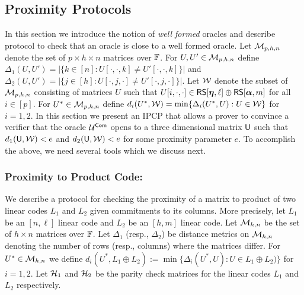 \subsection{Proximity Protocols}\label{sec:proximitybic}
In this section we introduce the notion of {\em well formed} oracles and
describe protocol to check that an oracle is close to a well formed oracle. Let
$\mathcal{M}_{p,h,n}$ denote the set of $p\times h\times n$ matrices over $\mathbb{F}$. For
$U,U'\in \mathcal{M}_{p,h,n}$ define $\Delta_1(U,U')=|\{k\in [n]: U[\cdot,\cdot,k]\neq
U'[\cdot,\cdot,k]\}|$ and $\Delta_2(U,U')=|\{j\in [h]: U[\cdot,j,\cdot]\neq
U'[\cdot,j,\cdot]\}|$. Let $\mathcal{W}$ denote the subset of $\mathcal{M}_{p,h,n}$
consisting of matrices $U$ such that $U[i,\cdot,\cdot]\in \mathsf{RS}[\bm{\eta},\ell]\oplus
\mathsf{RS}[\bm{\alpha},m]$ for all $i\in [p]$. For $U^\ast\in \mathcal{M}_{p,h,n}$ define
$d_i(U^\ast,\mathcal{W})=\min\{\Delta_i(U^\ast,U):U\in \mathcal{W}\}$ for $i=1,2$. In this
section we present an IPCP that allows a prover to convince a verifier that
the oracle $\mathcal{U}^{\mathsf{Com}}$ opens to a three dimensional matrix $\mathsf{U}$ such that
$d_1(\mathsf{U},\mathcal{W})<e$ and $d_2(\mathsf{U},\mathcal{W})<e$ for some proximity parameter
$e$. To accomplish the above, we need several tools which we discuss next.

\subsubsection{Proximity to Product Code:}
We describe a protocol for checking the proximity of a matrix to product of
two linear codes $L_1$ and $L_2$ given commitments to its columns. More
precisely, let $L_1$ be an $[n,\ell]$ linear code and $L_2$ be an $[h,m]$ linear
code. Let $\mathcal{M}_{h,n}$ be the set of $h\times n$ matrices over $\mathbb{F}$. Let
$\Delta_1$ (resp., $\Delta_2$) be distance metrics on $\mathcal{M}_{h,n}$ denoting the
number of rows (resp., columns) where the matrices differ. For $U^\ast\in
\mathcal{M}_{h,n}$ we define $d_i(U^\ast, L_1\oplus L_2) :=
\min\{\Delta_i(U^\ast,U):U\in L_1\oplus L_2)\}$ for
$i=1,2$. Let $\mathcal{H}_1$ and $\mathcal{H}_2$ be the parity check matrices for the
linear codes $L_1$ and $L_2$ respectively. 


